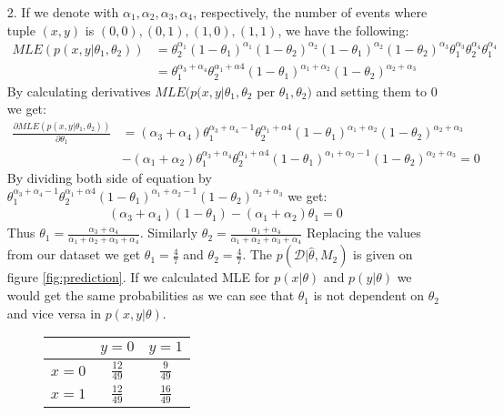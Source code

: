 \documentclass[10pt,a4paper]{article}
\begin{document}
\begin{enumerate}
\begin{enumerate}
\item[2.]
If we denote with $\alpha_1, \alpha_2, \alpha_3, \alpha_4$, respectively, the number of events where tuple $(x, y)$ is $(0, 0), (0, 1), (1, 0), (1, 1)$, we have the following:
\begin{align*}
MLE(p(x, y|\theta_1, \theta_2)) &= \theta_2^{\alpha_1}(1-\theta_1)^{\alpha_1}(1-\theta_2)^{\alpha_2}(1-\theta_1)^{\alpha_2}(1-\theta_2)^{\alpha_3}\theta_1^{\alpha_3}\theta_2^{\alpha_4}\theta_1^{\alpha_4} \nonumber \\
&= \theta_1^{\alpha_3 + \alpha_4}\theta_2^{\alpha_1+\alpha4}
(1-\theta_1)^{\alpha_1 + \alpha_2}(1-\theta_2)^{\alpha_2 + \alpha_3}
\end{align*}
By calculating derivatives $MLE(p(x, y|\theta_1, \theta_2$ per $\theta_1, \theta_2)$ and setting them to 0 we get:
\begin{align*}
\frac{\partial MLE(p(x, y|\theta_1, \theta_2))}{\partial \theta_1}&= (\alpha_3+\alpha_4)\theta_1^{\alpha_3+\alpha_4 -1}\theta_2^{\alpha_1+\alpha4}
(1-\theta_1)^{\alpha_1 + \alpha_2}(1-\theta_2)^{\alpha_2 + \alpha_3}\\
&- (\alpha_1+\alpha_2)\theta_1^{\alpha_3+\alpha_4}\theta_2^{\alpha_1+\alpha4}
(1-\theta_1)^{\alpha_1 + \alpha_2-1}(1-\theta_2)^{\alpha_2 + \alpha_3}=0
\end{align*}
By dividing both side of equation by $\theta_1^{\alpha_3+\alpha_4-1}\theta_2^{\alpha_1+\alpha4}
(1-\theta_1)^{\alpha_1 + \alpha_2-1}(1-\theta_2)^{\alpha_2 + \alpha_3}$ we get:
\begin{align*}
(\alpha_3+\alpha_4)(1-\theta_1)- (\alpha_1 + \alpha_2)\theta_1 = 0
\end{align*}
Thus $\theta_1 = \frac{\alpha_3+\alpha_4}{\alpha_1+\alpha_2 + \alpha_3+\alpha_4}$. Similarly $\theta_2 = \frac{\alpha_1+\alpha_4}{\alpha_1+\alpha_2 + \alpha_3+\alpha_4}$
Replacing the values from our dataset we get $\theta_1 = \frac{4}{7}$ and $\theta_2=\frac{4}{7}$. The $p(\mathcal{D}|\hat{\theta},M_2)$ is given on figure
\ref{fig:prediction}. If we calculated MLE for $p(x|\theta)$ and $p(y|\theta)$ we would get the same probabilities as we can see that $\theta_1$ is not dependent on $\theta_2$ and vice versa in $p(x, y|\theta)$.
\begin{figure}[htb!]
\begin{center}
\begin{tabular}{c|cc}
 & $y=0$ & $y=1$ \\ 
\hline 
$x=0$ & $\frac{12}{49}$ & $\frac{9}{49}$ \\ 
$x=1$ & $\frac{12}{49}$ & $\frac{16}{49}$ \\ 

\end{tabular}
\end{center}
\end{figure}
\end{enumerate}
\end{enumerate}
\end{document}
